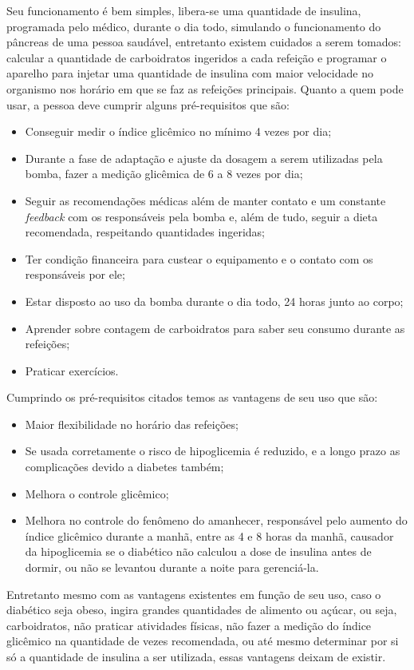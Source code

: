Seu funcionamento é bem simples, libera-se uma quantidade de insulina, programada pelo médico, durante o dia todo, simulando o funcionamento do pâncreas de uma pessoa saudável, entretanto existem cuidados a serem tomados: calcular a quantidade de carboidratos ingeridos a cada refeição e programar o aparelho para injetar uma quantidade de insulina com maior velocidade no organismo nos horário em que se faz as refeições principais.
Quanto a quem pode usar, a pessoa deve cumprir alguns pré-requisitos que são:
\begin{itemize}
\item Conseguir medir o índice glicêmico no mínimo 4 vezes por dia;
\item Durante a fase de adaptação e ajuste da dosagem a serem utilizadas pela bomba, fazer a medição glicêmica de 6 a 8 vezes por dia;
\item Seguir as recomendações médicas além de manter contato e um constante \emph{feedback} com os responsáveis pela bomba e, além de tudo, seguir a dieta recomendada, respeitando quantidades ingeridas;
\item Ter condição financeira para custear o equipamento e o contato com os responsáveis por ele;
\item Estar disposto ao uso da bomba durante o dia todo, 24 horas junto ao corpo;
\item Aprender sobre contagem de carboidratos para saber seu consumo durante as refeições;
\item Praticar exercícios.
\end{itemize}

Cumprindo os pré-requisitos citados temos as vantagens de seu uso que são:

\begin{itemize}
\item Maior flexibilidade no horário das refeições;
\item Se usada corretamente o risco de hipoglicemia é reduzido, e a longo prazo as complicações devido a diabetes também;
\item Melhora o controle glicêmico;
\item Melhora no controle do fenômeno do amanhecer, responsável pelo aumento do índice glicêmico durante a manhã, entre as 4 e 8 horas da manhã, causador da hipoglicemia se o diabético não calculou a dose de insulina antes de dormir, ou não se levantou durante a noite para gerenciá-la.
\end{itemize}

Entretanto mesmo com as vantagens existentes em função de seu uso, caso o diabético seja obeso, ingira grandes quantidades de alimento ou açúcar, ou seja, carboidratos, não praticar atividades físicas, não fazer a medição do índice glicêmico na quantidade de vezes recomendada, ou até mesmo determinar por si só a quantidade de insulina a ser utilizada, essas vantagens deixam de existir.

